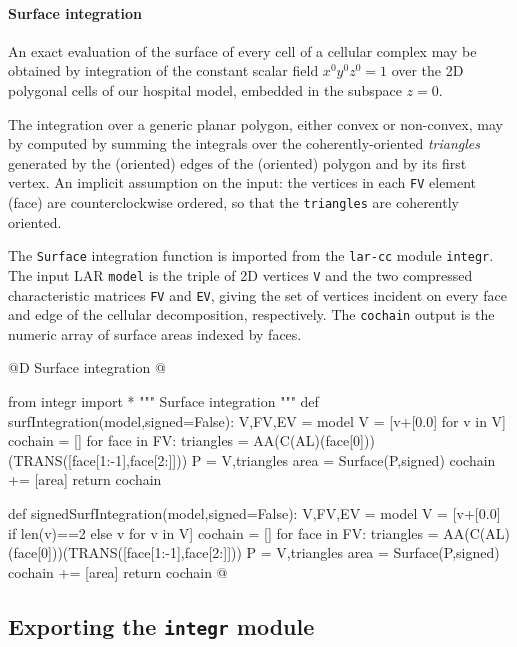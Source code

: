 \documentclass[11pt,oneside]{article}	%
\begin{document}
\paragraph{Surface integration}

An exact evaluation of the surface of every cell of a cellular complex may be obtained by integration of the constant scalar field $x^0y^0z^0 = 1$ over the 2D polygonal cells of our hospital model, embedded in the subspace $z=0$. 

The integration over a generic planar polygon, either convex or non-convex, may by computed by summing the integrals over the coherently-oriented \emph{triangles} generated by the (oriented) edges of the (oriented) polygon and by its first vertex. An implicit assumption on the input: the vertices in each \texttt{FV} element (face) are counterclockwise ordered, so that the \texttt{triangles} are coherently oriented.

The \texttt{Surface} integration function is imported from the \texttt{lar-cc} module \texttt{integr}. The input LAR \texttt{model} is the triple of 2D vertices \texttt{V} and the two compressed characteristic matrices \texttt{FV} and \texttt{EV}, giving the set of vertices incident on every face and edge of the cellular decomposition, respectively. The \texttt{cochain} output is the numeric array of surface areas indexed by faces. 

@D Surface integration
@{from integr import *
""" Surface integration """
def surfIntegration(model,signed=False):
    V,FV,EV = model
    V = [v+[0.0] for v in V]
    cochain = []
    for face in FV:
        triangles = AA(C(AL)(face[0]))(TRANS([face[1:-1],face[2:]]))
        P = V,triangles
        area = Surface(P,signed) 
        cochain += [area]
    return cochain

def signedSurfIntegration(model,signed=False):
    V,FV,EV = model
    V = [v+[0.0] if len(v)==2 else v for v in V]
    cochain = []
    for face in FV:
        triangles = AA(C(AL)(face[0]))(TRANS([face[1:-1],face[2:]]))
        P = V,triangles
        area = Surface(P,signed) 
        cochain += [area]
    return cochain
@}




\subsection{Exporting the \texttt{integr} module}
\end{document}
